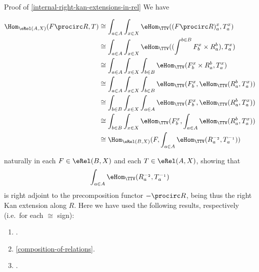 \begin{Proof}{Proof of \cref{internal-right-kan-extensions-in-rel}}%
    We have
    \begin{envsmallsize}
        \begin{align*}
            \Hom_{\eRel(A,X)}(F\procirc R,T) &\cong  \int_{a\in A}\int_{x\in X}\eHom_{\TTV}((F\procirc R)^{x}_{a},T^{x}_{a})\\
                                             &\cong  \int_{a\in A}\int_{x\in X}\eHom_{\TTV}((\int^{b\in B}F^{x}_{b}\times R^{b}_{a}),T^{x}_{a})\\
                                             &\cong  \int_{a\in A}\int_{x\in X}\int_{b\in B}\eHom_{\TTV}(F^{x}_{b}\times R^{b}_{a},T^{x}_{a})\\
                                             &\cong  \int_{a\in A}\int_{x\in X}\int_{b\in B}\eHom_{\TTV}(F^{x}_{b},\eHom_{\TTV}(R^{b}_{a},T^{x}_{a}))\\
                                             &\cong  \int_{b\in B}\int_{x\in X}\int_{a\in A}\eHom_{\TTV}(F^{x}_{b},\eHom_{\TTV}(R^{b}_{a},T^{x}_{a}))\\
                                             &\cong  \int_{b\in B}\int_{x\in X}\eHom_{\TTV}(F^{x}_{b},\int_{a\in A}\eHom_{\TTV}(R^{b}_{a},T^{x}_{a}))\\
                                             &\cong  \Hom_{\eRel(B,X)}(F,\int_{a\in A}\eHom_{\TTV}(R^{-_{2}}_{a},T^{-_{1}}_{a}))%
        \end{align*}
    \end{envsmallsize}
    naturally in each $F\in\eRel(B,X)$ and each $T\in\eRel(A,X)$, showing that
    \[
        \int_{a\in A}\eHom_{\TTV}(R^{-_{2}}_{a},T^{-_{1}}_{a})%
    \]%
    is right adjoint to the precomposition functor $-\procirc R$, being thus the right Kan extension along $R$. Here we have used the following results, respectively (i.e.\ for each $\cong$ sign):
    \begin{enumerate}
        \item\label{proof-of-existence-of-internal-right-kan-extensions-in-rel-1}.
        \item\label{proof-of-existence-of-internal-right-kan-extensions-in-rel-2}\cref{composition-of-relations}.
        \item\label{proof-of-existence-of-internal-right-kan-extensions-in-rel-3}.

\end{enumerate}
\end{Proof}

